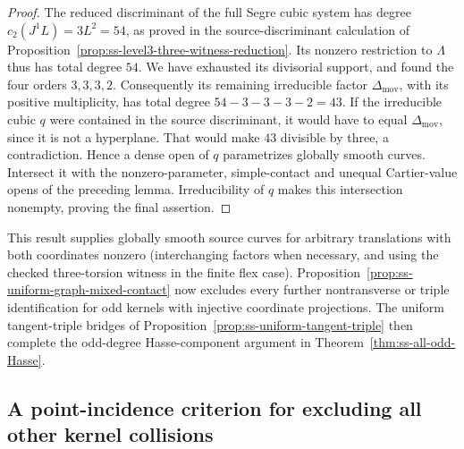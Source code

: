 \begin{proof}
The reduced discriminant of the full Segre cubic system has degree
$c_2(J^1L)=3L^2=54$, as proved in the source-discriminant calculation
of Proposition~\ref{prop:ss-level3-three-witness-reduction}.
Its nonzero restriction to $\Lambda$ thus has total degree $54$.
We have exhausted its divisorial support, and found the four orders
$3,3,3,2$. Consequently its remaining irreducible factor
$\Delta_{\mathrm{mov}}$, with its positive multiplicity, has total
degree $54-3-3-3-2=43$.
If the irreducible cubic $q$ were contained in the source discriminant,
it would have to equal $\Delta_{\mathrm{mov}}$, since it is not a
hyperplane. That would make $43$ divisible by three, a contradiction.
Hence a dense open of $q$ parametrizes globally smooth curves.
Intersect it with the nonzero-parameter, simple-contact and unequal
Cartier-value opens of the preceding lemma. Irreducibility of $q$
makes this intersection nonempty, proving the final assertion.
\end{proof}

\begin{remark}\label{auto:A_monodromy:9f1f96604bfd}

This result supplies globally smooth source curves for arbitrary
translations with both coordinates nonzero (interchanging factors
when necessary, and using the checked three-torsion witness in the
finite flex case). Proposition~\ref{prop:ss-uniform-graph-mixed-contact}
now excludes every further nontransverse or triple identification
for odd kernels with injective coordinate projections. The uniform
tangent-triple bridges of Proposition~\ref{prop:ss-uniform-tangent-triple}
then complete the odd-degree Hasse-component argument in
Theorem~\ref{thm:ss-all-odd-Hasse}.
\end{remark}


\subsection{A point-incidence criterion for excluding all other kernel collisions}
\label{subsec:ss-uniform-collision-exclusion}

